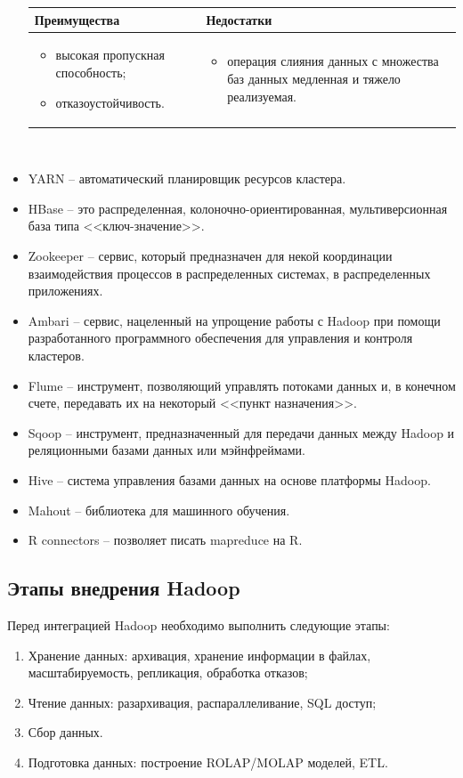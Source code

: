 \begin{itemize}
          \begin{tabularx}{450pt}{X|X}
              \textbf{Преимущества}     & \textbf{Недостатки} \\
              \hline
              \begin{itemize}[noitemsep,nolistsep,leftmargin=0pt,labelindent=0pt]
                  \item высокая пропускная способность;
                  \item отказоустойчивость.
              \end{itemize} &
              \begin{itemize}[noitemsep,nolistsep,leftmargin=0pt,labelindent=0pt]
                  \item операция слияния данных с множества баз данных медленная и тяжело реализуемая.
              \end{itemize}
          \end{tabularx}\\
    \item YARN -- автоматический планировщик ресурсов кластера.
    \item HBase -- это распределенная, колоночно-ориентированная, мультиверсионная база типа <<ключ-значение>>.
    \item Zookeeper -- сервис, который предназначен для некой координации взаимодействия процессов в распределенных системах, в распределенных приложениях.
    \item Ambari -- сервис, нацеленный на упрощение работы с Hadoop при помощи разработанного программного обеспечения для управления и контроля кластеров.
    \item Flume -- инструмент, позволяющий управлять потоками данных и, в конечном счете, передавать их на некоторый <<пункт назначения>>.
    \item Sqoop -- инструмент, предназначенный для передачи данных между Hadoop и реляционными базами данных или мэйнфреймами.
    \item Hive -- система управления базами данных на основе платформы Hadoop.
    \item Mahout -- библиотека для машинного обучения.
    \item R connectors -- позволяет писать mapreduce на R.
\end{itemize}

\subsection{Этапы внедрения Hadoop}
Перед интеграцией Hadoop необходимо выполнить следующие этапы:
\begin{enumerate}
    \item Хранение данных: архивация, хранение информации в файлах, масштабируемость, репликация, обработка отказов;
    \item Чтение данных: разархивация, распараллеливание, SQL доступ;
    \item Сбор данных.
    \item Подготовка данных: построение ROLAP/MOLAP моделей, ETL.
\end{enumerate}

